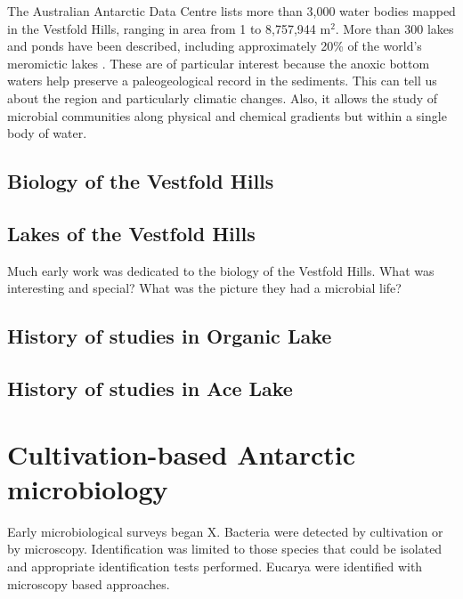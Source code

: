 The Australian Antarctic Data Centre lists more than 3,000 water bodies mapped in the Vestfold Hills, ranging in area from 1 to 8,757,944 m$^2$. %
More than 300 lakes and ponds have been described, including approximately 20\% of the world's meromictic lakes \cite{Gibson, 1999}. %
These are of particular interest because the anoxic bottom waters help preserve a paleogeological record in the sediments.
This can tell us about the region and particularly climatic changes.
Also, it allows the study of microbial communities along physical and chemical gradients but within a single body of water.



\subsection{Biology of the Vestfold Hills}

\subsection{Lakes of the Vestfold Hills}

Much early work was dedicated to the biology of the Vestfold Hills.
What was interesting and special?
What was the picture they had a microbial life?

\subsection{History of studies in Organic Lake}
\subsection{History of studies in Ace Lake}


\section{Cultivation-based Antarctic microbiology}

Early microbiological surveys began X.
Bacteria were detected by cultivation or by microscopy. 
Identification was limited to those species that could be isolated and appropriate identification tests performed.
Eucarya were identified with microscopy based approaches.


